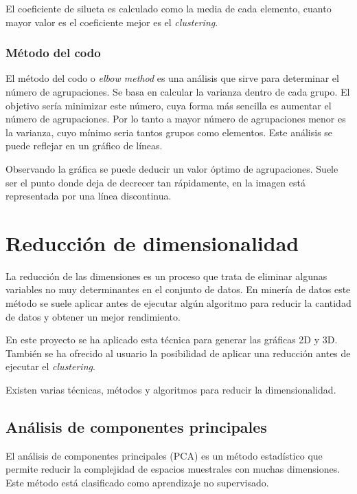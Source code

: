 
El coeficiente de silueta es calculado como la media de cada elemento, cuanto mayor valor es el coeficiente mejor es el \emph{clustering}.

\subsubsection{Método del codo}
El método del codo o \emph{elbow method} es una análisis que sirve para determinar el número de agrupaciones. Se basa en calcular la varianza dentro de cada grupo. El objetivo sería minimizar este número, cuya forma más sencilla es aumentar el número de agrupaciones. Por lo tanto a mayor número de agrupaciones menor es la varianza, cuyo mínimo seria tantos grupos como elementos. Este análisis se puede reflejar en un gráfico de líneas.


Observando la gráfica se puede deducir un valor óptimo de agrupaciones. Suele ser el punto donde deja de decrecer tan rápidamente, en la imagen está representada por una línea discontinua.

\section{Reducción de dimensionalidad}
La reducción de las dimensiones \cite{wiki:dimensiones} es un proceso que trata de eliminar algunas variables no muy determinantes en el conjunto de datos. En minería de datos este método se suele aplicar antes de ejecutar algún algoritmo para reducir la cantidad de datos y obtener un mejor rendimiento.


En este proyecto se ha aplicado esta técnica para generar las gráficas 2D y 3D. También se ha ofrecido al usuario la posibilidad de aplicar una reducción antes de ejecutar el \emph{clustering}.

Existen varias técnicas, métodos y algoritmos para reducir la dimensionalidad.

\subsection{Análisis de componentes principales}
El análisis de componentes principales (PCA) \cite{PCA} es un método estadístico que permite reducir la complejidad de espacios muestrales con muchas dimensiones. Este método está clasificado como aprendizaje no supervisado.

